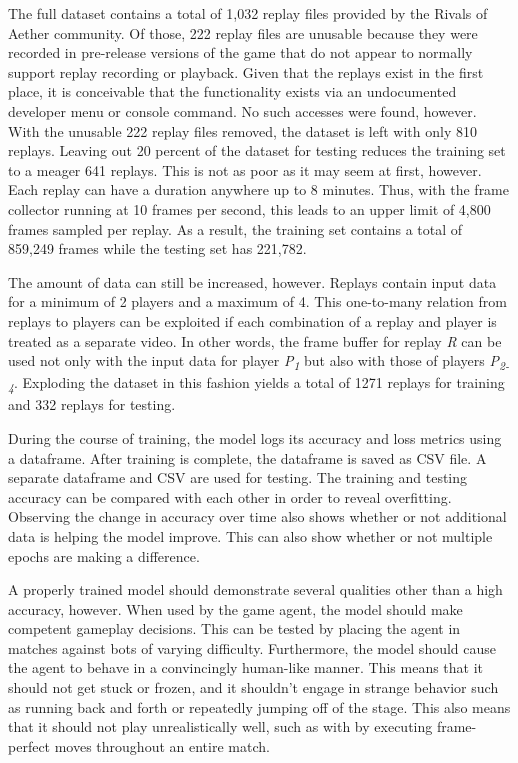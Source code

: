 The full dataset contains a total of 1,032 replay files provided by the Rivals of Aether community. Of those, 222 replay files are unusable because they were recorded in pre-release versions of the game that do not appear to normally support replay recording or playback. Given that the replays exist in the first place, it is conceivable that the functionality exists via an undocumented developer menu or console command. No such accesses were found, however. With the unusable 222 replay files removed, the dataset is left with only 810 replays. Leaving out 20 percent of the dataset for testing reduces the training set to a meager 641 replays. This is not as poor as it may seem at first, however. Each replay can have a duration anywhere up to 8 minutes. Thus, with the frame collector running at 10 frames per second, this leads to an upper limit of 4,800 frames sampled per replay. As a result, the training set contains a total of 859,249 frames while the testing set has 221,782.

The amount of data can still be increased, however. Replays contain input data for a minimum of 2 players and a maximum of 4. This one-to-many relation from replays to players can be exploited if each combination of a replay and player is treated as a separate video. In other words, the frame buffer for replay \textit{R} can be used not only with the input data for player \textit{\textit{P\textsubscript{1}}} but also with those of players \textit{P\textsubscript{2-4}}. Exploding the dataset in this fashion yields a total of 1271 replays for training and 332 replays for testing. 

During the course of training, the model logs its accuracy and loss metrics using a dataframe. After training is complete, the dataframe is saved as CSV file. A separate dataframe and CSV are used for testing. The training and testing accuracy can be compared with each other in order to reveal overfitting. Observing the change in accuracy over time also shows whether or not additional data is helping the model improve. This can also show whether or not multiple epochs are making a difference.

A properly trained model should demonstrate several qualities other than a high accuracy, however. When used by the game agent, the model should make competent gameplay decisions. This can be tested by placing the agent in matches against bots of varying difficulty. Furthermore, the model should cause the agent to behave in a convincingly human-like manner. This means that it should not get stuck or frozen, and it shouldn't engage in strange behavior such as running back and forth or repeatedly jumping off of the stage. This also means that it should not play unrealistically well, such as with by executing frame-perfect moves throughout an entire match.

